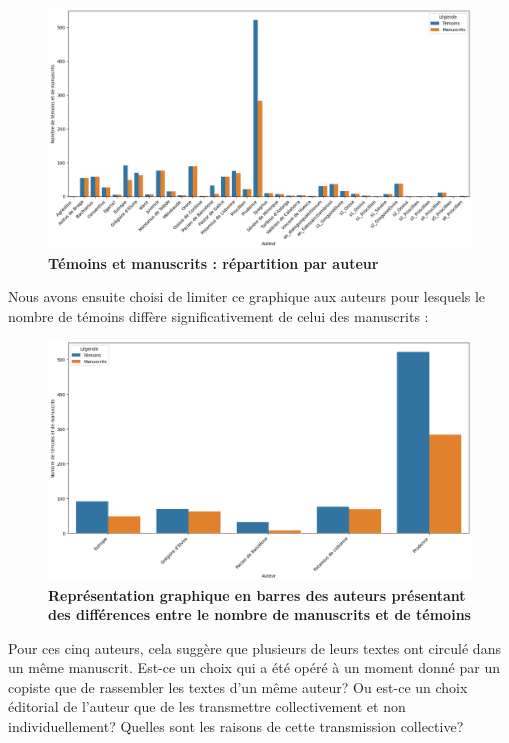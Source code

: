 \documentclass[a4paper,twoside,12pt]{book}
\begin{document}
\begin{figure}[H]
	\centering
	\includegraphics[width=\textwidth]{img/auteursdiff.png}  
	\caption{\textbf{Témoins et manuscrits : répartition par auteur}}
	\label{fig:monimage}
\end{figure}

Nous avons ensuite choisi de limiter ce graphique aux auteurs pour lesquels le nombre de témoins diffère significativement de celui des manuscrits :

\begin{figure}[H]
	\centering
	\includegraphics[width=\textwidth]{img/auteursrestriction.png} 
	\caption{\textbf{Représentation graphique en barres des auteurs présentant des différences entre le nombre de manuscrits et de témoins}}
	\label{fig:monimage}
\end{figure}

Pour ces cinq auteurs, cela suggère que plusieurs de leurs textes ont circulé dans un même manuscrit. Est-ce un choix qui a été opéré à un moment
donné par un copiste que de rassembler les textes d’un même auteur? Ou est-ce un choix éditorial de l’auteur que de les transmettre collectivement et non individuellement? Quelles sont les raisons de cette transmission collective?
\end{document}
